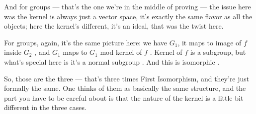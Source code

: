 \begin{speech}[01:11:44 - 01:12:30]
And for groups --- that's the one we're in the middle of proving --- the issue here  was the kernel is always just a vector space, it's exactly the same flavor as all the objects; here  the kernel's different, it's an ideal, that was the twist here.

For groups, again, it's the same picture here: we have $G_1$, it maps to image of $f$ inside $G_2$ , and $G_1$ maps to $G_1$ mod kernel of $f$ . Kernel of $f$  is a subgroup, but what's special here is it's a normal subgroup . And this is isomorphic .

So, those are the three --- that's three times First Isomorphism, and they're just formally the same. One thinks of them as basically the same structure, and the part you have to be careful about is that the nature of the kernel is a little bit different in the three cases.
\end{speech}

